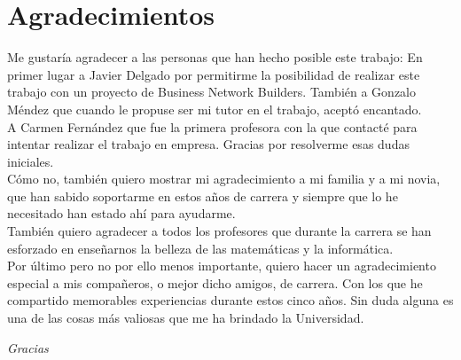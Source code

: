 \chapter*{Agradecimientos}
	Me gustaría agradecer a las personas que han hecho posible este trabajo:
	En primer lugar a Javier Delgado por permitirme la posibilidad de realizar este trabajo con un proyecto de Business Network Builders.
	También a Gonzalo Méndez que cuando le propuse ser mi tutor en el trabajo, aceptó encantado.\\

	A Carmen Fernández que fue la primera profesora con la que contacté para intentar realizar el trabajo en empresa.
	Gracias por resolverme esas dudas iniciales.\\
	
	Cómo no, también quiero mostrar mi agradecimiento a mi familia y a mi novia, 
	que han sabido soportarme en estos años de carrera y siempre que lo he necesitado han estado ahí para ayudarme.\\
	
	También quiero agradecer a todos los profesores que durante la carrera se han esforzado en enseñarnos la belleza de las matemáticas y la informática.\\
	
	Por último pero no por ello menos importante, quiero hacer un agradecimiento especial a mis compañeros, o mejor dicho amigos, de carrera.
	Con los que he compartido memorables experiencias durante estos cinco años. Sin duda alguna es una de las cosas más valiosas que me ha brindado la Universidad.\\
	
	
	\begin{center}
		\textit{Gracias}
	\end{center}
	
	
	
	

		

